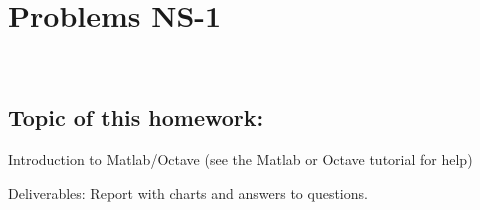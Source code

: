 


\newpage


\noindent
\underline{\hspace{\textwidth}}
\section{Problems NS-1}%
\noindent \underline{\hspace{\textwidth}}



\noindent \\   %
\subsection*{Topic of this homework:}
Introduction to Matlab/Octave (see the Matlab or Octave tutorial for help)

Deliverables: Report with charts and answers to questions.






